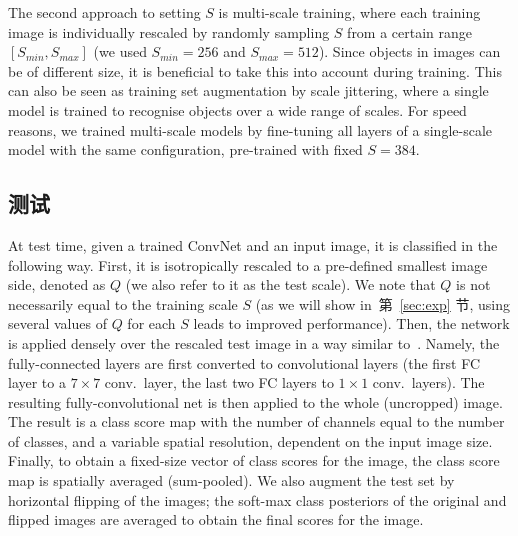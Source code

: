 \documentclass{article} %
\newcommand{\sref}[1]{第~\ref{#1} 节}
\begin{document}
The second approach to setting $S$ is multi-scale training, where each training image is individually rescaled by randomly sampling $S$ from a certain range $\left[S_{min},S_{max}\right]$ (we used $S_{min}=256$ and $S_{max}=512$). 
Since objects in images can be of different size, it is beneficial to take this into account during training.
This can also be seen as training set augmentation by scale jittering, where a single model is trained to recognise objects over a wide range of scales.
For speed reasons, we trained multi-scale models by fine-tuning all layers of a single-scale model with the same configuration, pre-trained with fixed $S=384$.

\subsection{测试}
\label{sec:test}
At test time, given a trained ConvNet and an input image, it is classified in the following way. 
First, it is isotropically rescaled to a pre-defined smallest image side, denoted as $Q$ (we also refer to it as the test scale).
We note that $Q$ is not necessarily equal to the training scale $S$ (as we will show in~\sref{sec:exp},
using several values of $Q$ for each $S$ leads to improved performance).
Then, the network is applied densely over the rescaled test image in a way similar to~\citep{Sermanet14}. Namely, the fully-connected layers are first converted to convolutional layers (the first FC layer to a $7\times7$ conv.\ layer, the last two FC layers to $1\times1$ conv.\ layers). The resulting fully-convolutional net is then applied to the whole (uncropped) image.
The result is a class score map with the number of channels equal to the number of classes, and a variable spatial resolution, dependent
on the input image size. Finally, to obtain a fixed-size vector of class scores for the image, the class score map is spatially averaged (sum-pooled).
We also augment the test set by horizontal flipping of the images; the soft-max class posteriors of the original and flipped images are averaged to obtain
the final scores for the image.
\end{document}
